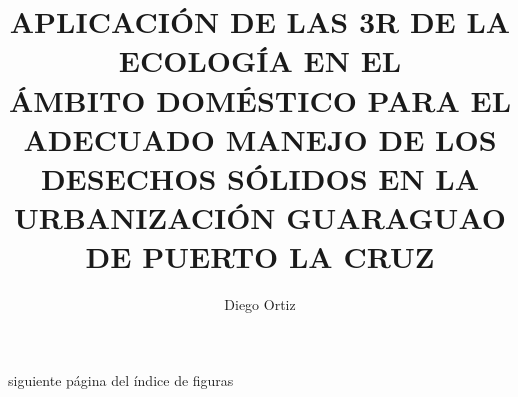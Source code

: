 \documentclass[pregrado]{tesis-usb}
\title{\large{APLICACIÓN DE LAS 3R DE LA ECOLOGÍA EN EL\\
ÁMBITO DOMÉSTICO PARA EL\\ 
ADECUADO MANEJO DE LOS DESECHOS SÓLIDOS EN LA\\[0.2cm]
URBANIZACIÓN GUARAGUAO DE PUERTO LA CRUZ}
}
\author{\textup{Diego Ortiz}}
\begin{document}
    \setlength{\parskip}{1em} %
    
    \frontmatter %

    \mainmatter %
    \setcounter{page}{1} %
    \tableofcontents %
    \newpage
    \listoffigures %
    \newpage
    siguiente página del índice de figuras
    \newpage
    \listoftables
    \newpage
    \nocite{*}
    {\setlength{\parskip}{-0.5cm}
    \printbibliography
    }
\end{document}
